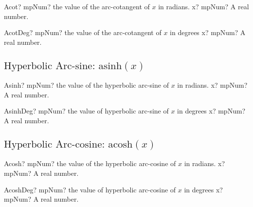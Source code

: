 \begin{mpFunctionsExtract}
	\mpFunctionOne
	{Acot? mpNum? the value of the arc-cotangent of $x$ in radians.}
	{x? mpNum? A real number.}
\end{mpFunctionsExtract}

\vspace{0.6cm}

\begin{mpFunctionsExtract}
	\mpFunctionOne
	{AcotDeg? mpNum? the value of the arc-cotangent of $x$ in degrees}
	{x? mpNum? A real number.}
\end{mpFunctionsExtract}




\subsection{\texorpdfstring{$\text{Hyperbolic Arc-sine: asinh}(x)$}{asinh}}

\begin{mpFunctionsExtract}
	\mpFunctionOne
	{Asinh? mpNum? the value of the hyperbolic arc-sine  of $x$ in radians.}
	{x? mpNum? A real number.}
\end{mpFunctionsExtract}

\vspace{0.6cm}

\begin{mpFunctionsExtract}
	\mpFunctionOne
	{AsinhDeg? mpNum? the value of hyperbolic arc-sine  of $x$ in degrees}
	{x? mpNum? A real number.}
\end{mpFunctionsExtract}





\subsection{\texorpdfstring{$\text{Hyperbolic Arc-cosine: acosh}(x)$}{acosh}}

\begin{mpFunctionsExtract}
	\mpFunctionOne
	{Acosh? mpNum? the value of the hyperbolic arc-cosine  of $x$ in radians.}
	{x? mpNum? A real number.}
\end{mpFunctionsExtract}

\vspace{0.6cm}

\begin{mpFunctionsExtract}
	\mpFunctionOne
	{AcoshDeg? mpNum? the value of hyperbolic arc-cosine  of $x$ in degrees}
	{x? mpNum? A real number.}
\end{mpFunctionsExtract}





